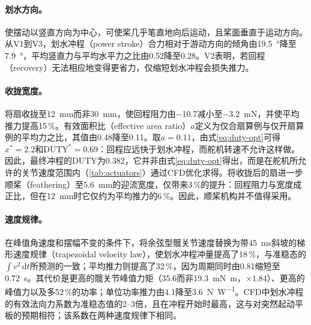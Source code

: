\paragraph{划水方向。}使摆动以竖直方向为中心，可使桨几乎笔直地向后运动，且桨面垂直于运动方向。从V1到V3，划水冲程（power stroke）合力相对于游动方向的倾角由\SI{19.5}{\degree}降至\SI{7.9}{\degree}，平均竖直力与平均水平力之比由0.52降至0.28。V2表明，若回程（recovery）无法相应地变得更省力，仅缩短划水冲程会损失推力。

\paragraph{收拢宽度。}将扇收拢至\SI{12}{\milli\metre}而非\SI{30}{\milli\metre}，使回程阻力由\SI{-10.7}{}减小至\SI{-3.2}{\milli\newton}，并使平均推力提高15\,\%。有效面积比（effective area ratio）$a$定义为仅合扇算例与仅开扇算例的平均力之比，其值由0.48降至0.11。取$a=0.11$，由式\eqref{eq:duty-opt}可得$x^*=2.2$和$\mathrm{DUTY}^*=0.69$：回程应远快于划水冲程，而舵机转速不允许这样做。因此，最终冲程的DUTY为0.382，它并非由式\eqref{eq:duty-opt}得出，而是在舵机所允许的关节速度范围内（\cref{tab:actuators}）通过CFD优化求得。将收拢后的扇进一步顺桨（feathering）至\SI{5.6}{\milli\metre}的迎流宽度，仅带来3\,\%的提升：回程阻力与宽度成正比，但在\SI{12}{\milli\metre}时它仅约为平均推力的6\,\%。因此，顺桨机构并不值得采用。

\paragraph{速度规律。}在峰值角速度和摆幅不变的条件下，将余弦型髋关节速度替换为带\SI{45}{\milli\second}斜坡的梯形速度规律（trapezoidal velocity law），使划水冲程冲量提高了18\,\%，与准稳态的$\int v^2\,\mathrm dt$所预测的一致；平均推力则提高了32\,\%，因为周期同时由\SI{0.81}{}缩短至\SI{0.72}{\second}。其代价是更高的髋关节峰值力矩（\SI{35.6}{}而非\SI{19.3}{\milli\newton\metre}，$\times1.84$）、更高的峰值力以及多52\,\%的功率；单位功率推力由\SI{4.1}{}降至\SI{3.6}{\newton\per\watt}。CFD中划水冲程的有效法向力系数为准稳态值的2--3倍，且在冲程开始时最高，这与对突然起动平板的预期相符\cite{Kim2011}；该系数在两种速度规律下相同。

